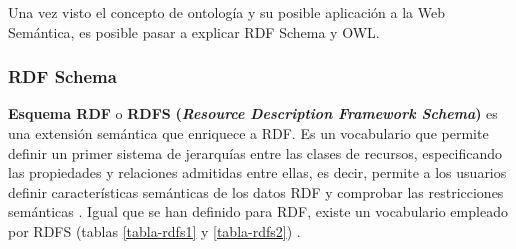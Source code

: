 
Una vez visto el concepto de ontología y su posible aplicación a la Web Semántica, es posible pasar a explicar RDF Schema y OWL.


\subsubsection{RDF Schema}

\textbf{Esquema RDF} o \textbf{RDFS} \textbf{(\textit{Resource Description Framework Schema})} es una extensión semántica que enriquece a RDF. Es un vocabulario que permite definir un primer sistema de jerarquías entre las clases de recursos, especificando las propiedades y relaciones admitidas entre ellas, es decir, permite a los usuarios definir características semánticas de los datos RDF y comprobar las restricciones semánticas \cite{web-semantica-w3c, libro-gis, aplicacion}. Igual que se han definido para RDF, existe un vocabulario empleado por RDFS (tablas \ref{tabla-rdfs1} y \ref{tabla-rdfs2}) \cite{tesis-otro}.






